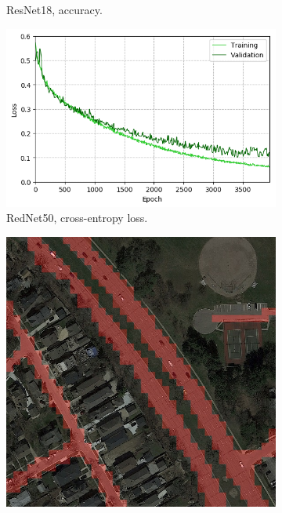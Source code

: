 \documentclass[10pt,conference,compsocconf]{IEEEtran}
\begin{document}
\begin{figure}
\begin{minipage}[t!]{.724\textwidth}
\begin{subfigure}[t!]{0.5\textwidth}
        \caption{ResNet18, accuracy.\label{fig:resnet_accuracy}}
        \includegraphics[width=\textwidth]{img/rednet50_all_loss}
        \caption{RedNet50, cross-entropy loss.\label{fig:rednet50_loss}}
    \end{subfigure}
    \caption{Training metrics}
    \label{fig:training_metrics}
    \end{minipage}
    \enspace
	\begin{minipage}[t!]{.195\textwidth}
    \begin{subfigure}[t!]{\textwidth}
        \centering
        \vspace*{.3\baselineskip}
        \includegraphics[width=\textwidth]{img/perfect}

\end{subfigure}
\end{minipage}
\end{figure}
\end{document}
